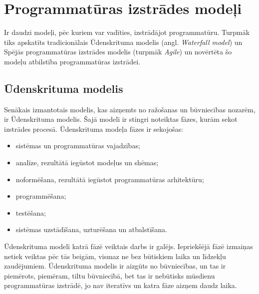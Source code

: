 \chapter{Programmatūras izstrādes modeļi}
Ir daudzi modeļi, pēc kuriem var vadīties, izstrādājot programmatūru. Turpmāk tiks apskatīts tradicionālais Ūdenskrituma modelis (angl. \textit{Waterfall model}) un Spējās programmatūras izstrādes modelis (turpmāk \textit{Agile})  un novērtēta šo modeļu atbilstība programmatūras izstrādei.
\section{Ūdenskrituma modelis}
Senākais izmantotais modelis, kas aizņemts no ražošanas un būvniecības nozarēm, ir Ūdenskrituma modelis. Šajā modelī ir stingri noteiktas fāzes, kurām sekot izstrādes procesā.
Ūdenskrituma modeļa fāzes ir sekojošas:
\begin{itemize}
	\item sistēmas un programmatūras vajadzības;
	\item analīze, rezultātā iegūstot modeļus un shēmas;
	\item noformēšana, rezultātā iegūstot programmatūras arhitektūru;
	\item programmēšana;
	\item testēšana;
	\item sistēmas uzstādīšana, uzturēšana un atbalstīšana.
\end{itemize}
Ūdenskrituma modelī katrā fāzē veiktais darbs ir galējs. Iepriekšējā fāzē izmaiņas netiek veiktas pēc tās beigām, vismaz ne bez būtiskiem laika un līdzekļu zaudējumiem.
Ūdenskrituma modelis ir aizgūts no būvniecības, un tas ir piemērots, piemēram, tiltu būvniecībā, bet tas ir nebūtisks mūsdienu programmatūras izstrādē, jo nav iteratīvs un katra fāze aizņem daudz laika.



